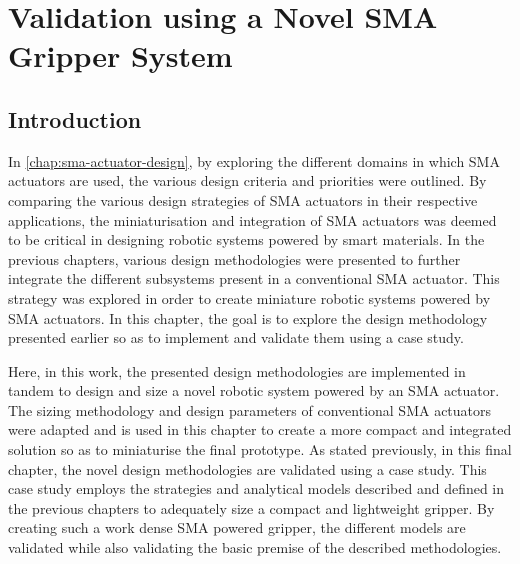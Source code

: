 
\chapter{Validation using a Novel SMA Gripper System}\label{chap:case-study}
\section{Introduction}
In \cref{chap:sma-actuator-design}, by exploring the different domains in which SMA actuators are used, the various design criteria and priorities were outlined. By comparing the various design strategies of SMA actuators in their respective applications, the miniaturisation and integration of SMA actuators was deemed to be critical in designing robotic systems powered by smart materials. In the previous chapters, various design methodologies were presented to further integrate the different subsystems present in a conventional SMA actuator. This strategy was explored in order to create miniature robotic systems powered by SMA actuators. In this chapter, the goal is to explore the design methodology presented earlier so as to implement and validate them using a case study.

Here, in this work, the presented design methodologies are implemented in tandem to design and size a novel robotic system powered by an SMA actuator. The sizing methodology and design parameters of conventional SMA actuators were adapted and is used in this chapter to create a more compact and integrated solution so as to miniaturise the final prototype. As stated previously, in this final chapter, the novel design methodologies are validated using a case study. This case study employs the strategies and analytical models described and defined in the previous chapters to adequately size a compact and lightweight gripper. By creating such a work dense SMA powered gripper, the different models are validated while also validating the basic premise of the described methodologies.

